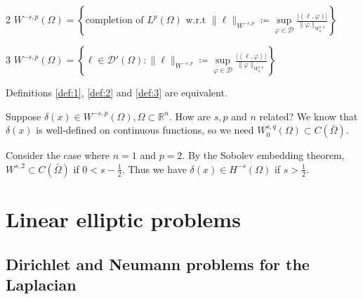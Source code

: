 \documentclass{report}
\begin{document}
\begin{definition}{}{2}
    \(W^{-s, p}(\Omega) = \left\{\text{completion of } L^{p}(\Omega) \text{ w.r.t } \|\ell\|_{W^{-s, p}} \coloneqq \sup\limits_{\varphi \in \mathcal{D}} \frac{\vert (\ell, \varphi) \vert }{\|\varphi\|_{W^{s, q}_{0}}} \right\} \) 
\end{definition}

\begin{definition}{}{3}
    \(W^{-s, p}(\Omega) = \left\{\ell \in \mathcal{D}'(\Omega) : \|\ell\|_{W^{-s, p}} \coloneqq \sup\limits_{\varphi \in \mathcal{D}} \frac{\vert\left\langle \ell, \varphi \right\rangle\vert}{\|\varphi\|_{W^{s, q}_{0}}} \right\} \)
\end{definition}

\mprop{}
{
    Definitions \ref{def:1}, \ref{def:2} and \ref{def:3} are equivalent.
}

\begin{question}{}{}
    Suppose \(\delta(x) \in W^{-s, p}(\Omega), \Omega \subset \mathbb{R}^{n}\). How are \(s, p\) and \(n\) related? We know that \(\delta(x)\) is well-defined on continuous functions, so we need \(W^{s, q}_{0}(\Omega) \subset C(\bar{\Omega})\).
\end{question}

\begin{example}{}{}
    Consider the case where \(n=1\) and \(p=2\). By the Sobolev embedding theorem, \(W^{s, 2} \subset C(\bar{\Omega})\) if \(0 < s - \frac{1}{2}\). 
    Thus we have \(\delta(x) \in H^{-s}(\Omega)\) if \(s>\frac{1}{2}\).
\end{example}

\chapter{Linear elliptic problems}
\section{Dirichlet and Neumann problems for the Laplacian}
\end{document}

